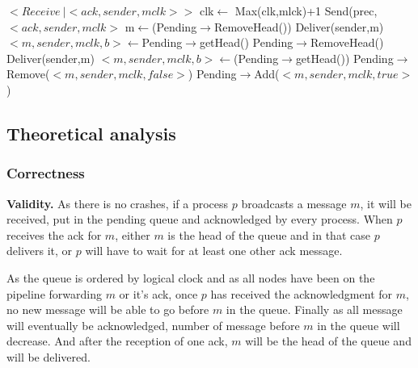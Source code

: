 \documentclass[a4paper]{article}
\begin{document}
\begin{algorithm}[H]
    \centering
    \begin{algorithmic}[5]

        \Event $<Receive\  | <ack,sender, mclk>>$
        \State clk$\gets$ Max(clk,mlck)+1
        \State Send(prec,$<ack,sender,mclk>$
        \EndIf
        \State m$\gets$(Pending$\rightarrow$RemoveHead())
        \State Deliver(sender,m)
        \State $<m,sender,mclk,b>\gets$Pending$\rightarrow$getHead()
        \State Pending$\rightarrow$RemoveHead()
        \State Deliver(sender,m)
        \State $<m,sender,mclk,b>\gets$(Pending$\rightarrow$getHead())
        \EndWhile
        \Else
        \State Pending$\rightarrow$Remove($<m,sender,mclk,false>$)
        \State Pending$\rightarrow$Add($<m,sender,mclk,true>$)
        \EndIf
        \EndEvent
    \end{algorithmic}
\end{algorithm}


\subsection{Theoretical analysis}
\subsubsection{Correctness}
\label{sec:pipelineack-proof}
\noindent\textbf{Validity.} As there is no crashes, if a process $p$
broadcasts a message $m$, it will be received, put in the pending queue and
acknowledged by every process. When $p$ receives the ack for $m$, either $m$
is the head of the queue and in that case $p$ delivers it, or $p$ will have
to wait for at least one other ack message. 
 
As the queue is ordered by logical clock and as all nodes have been on the
pipeline forwarding $m$ or it's ack, once $p$ has received the  acknowledgment
for $m$, no new message will be able to go before $m$ in the queue. Finally as
all message will eventually be acknowledged, number of message before $m$ in
the queue will decrease. And after the reception of one ack, $m$ will be the
head of the queue and will be delivered.
\end{document}
